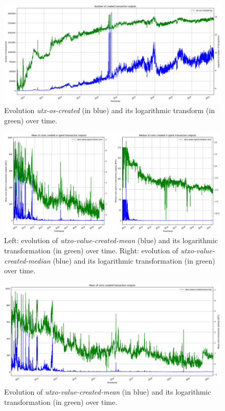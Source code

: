 \begin{figure}[H]
    \centering
    \includegraphics[width=\textwidth]{methods/images/utxo_created.png}
    \caption{Evolution \emph{utx-os-created} (in blue) and its logarithmic transform (in green) over time.}
    \label{fig:utxo_created}
\end{figure}

\begin{figure}[H]
    \centering
    \includegraphics[width=\textwidth]{methods/images/utxo_value_spent.png}
    \caption{Left: evolution of \emph{utxo-value-created-mean} (blue) and its logarithmic transformation (in green) over time. Right: evolution of \emph{utxo-value-created-median} (blue) and its logarithmic transformation (in green) over time.}
    \label{fig:utxo_value_spent}
\end{figure}

\begin{figure}[H]
    \centering
    \includegraphics[width=\textwidth]{methods/images/mean_utxo_created.png}
    \caption{Evolution of \emph{utxo-value-created-mean} (in blue) and its logarithmic transformation (in green) over time.}
    \label{fig:mean_utxo_created}
\end{figure}
